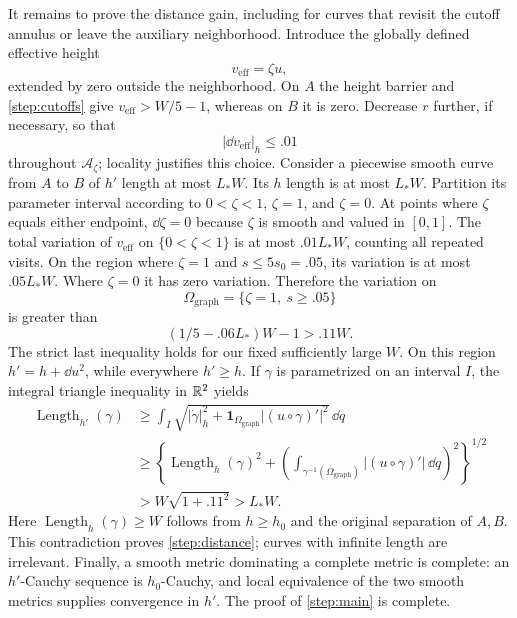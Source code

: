 It remains to prove the distance gain, including for curves that revisit
the cutoff annulus or leave the auxiliary neighborhood.  Introduce the
globally defined effective height
\[
 v_{\mathrm{eff}}=\zeta u,
\]
extended by zero outside the neighborhood.  On $A$ the height barrier
and \cref{step:cutoffs} give $v_{\mathrm{eff}}>W/5-1$, whereas on $B$
it is zero.  Decrease $r$ further, if necessary, so that
\begin{equation}\label{step:height-cutoff}
 |\dd v_{\mathrm{eff}}|_h\le .01
\end{equation}
throughout $\mathcal A_\zeta$; locality justifies this choice.
Consider a piecewise smooth curve from $A$ to $B$ of $h'$ length at most
$L_*W$.  Its $h$ length is at most $L_*W$.  Partition its parameter interval according to $0<\zeta<1$,
$\zeta=1$, and $\zeta=0$. At points where $\zeta$ equals either endpoint,
$\dd\zeta=0$ because $\zeta$ is smooth and valued in $[0,1]$.
The total variation of
$v_{\mathrm{eff}}$ on $\{0<\zeta<1\}$ is at most $.01L_*W$,
counting all repeated visits.  On the region where $\zeta=1$ and
$s\le5s_0=.05$, its variation is at most $.05L_*W$.  Where $\zeta=0$
it has zero variation.  Therefore the variation on
\[
 \Omega_{\mathrm{graph}}=\{\zeta=1,\ s\ge .05\}
\]
is greater than
\[
 (1/5-.06L_*)W-1>.11W.
\]
The strict last inequality holds for our fixed sufficiently large $W$.
On this region $h'=h+\dd u^2$, while everywhere $h'\ge h$.
If $\gamma$ is parametrized on an interval $I$, the integral triangle
inequality in $\mathbb R^2$ yields
\begin{align*}
 \operatorname{Length}_{h'}(\gamma)
 &\ge\int_I\sqrt{|\dot\gamma|_h^2+
      \mathbf1_{\Omega_{\mathrm{graph}}}|(u\circ\gamma)'|^2}
       \,\dd q\\
 &\ge\left\{
   \operatorname{Length}_h(\gamma)^2+
   \left(\int_{\gamma^{-1}(\Omega_{\mathrm{graph}})}
     |(u\circ\gamma)'|\,\dd q\right)^2
   \right\}^{1/2}\\
 &>W\sqrt{1+.11^2}>L_*W.
\end{align*}
Here $\operatorname{Length}_h(\gamma)\ge W$ follows from $h\ge h_0$
and the original separation of $A,B$.  This contradiction proves
\cref{step:distance}; curves with infinite length are irrelevant.
Finally, a smooth metric dominating a complete metric is complete:
an $h'$-Cauchy sequence is $h_0$-Cauchy, and local equivalence of the
two smooth metrics supplies convergence in $h'$.  The proof of
\cref{step:main} is complete.
